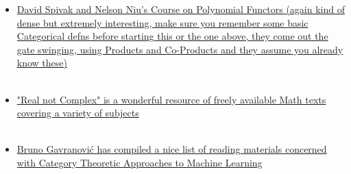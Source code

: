 \begin{itemize}
    \item \href{https://youtube.com/playlist?list=PLhgq-BqyZ7i6IjU82EDzCqgERKjjIPlmh}{David Spivak and Nelson Niu's Course on Polynomial Functors (again kind of dense but extremely interesting, make sure you remember some basic Categorical defns before starting this or the one above, they come out the gate swinging, using Products and Co-Products and they assume you already know these)} \\ \\
    \item \href{https://realnotcomplex.com}{"Real not Complex" is a wonderful resource of freely available Math texts covering a variety of subjects}\\ \\
    \item \href{https://github.com/bgavran/Category_Theory_Machine_Learning}{Bruno Gavranovi\'{c} has compiled a nice list of reading materials concerned with Category Theoretic Approaches to Machine Learning}\\ 
\end{itemize}
